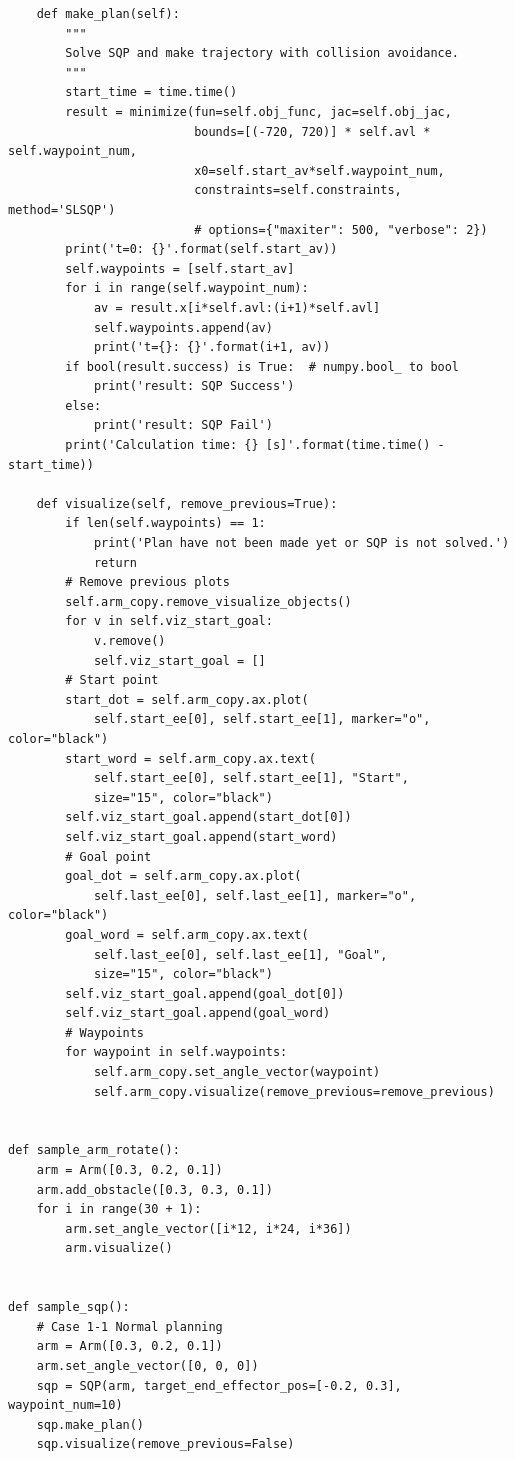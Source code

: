 \begin{verbatim}
    def make_plan(self):
        """
        Solve SQP and make trajectory with collision avoidance.
        """
        start_time = time.time()
        result = minimize(fun=self.obj_func, jac=self.obj_jac,
                          bounds=[(-720, 720)] * self.avl * self.waypoint_num,
                          x0=self.start_av*self.waypoint_num,
                          constraints=self.constraints, method='SLSQP')
                          # options={"maxiter": 500, "verbose": 2})
        print('t=0: {}'.format(self.start_av))
        self.waypoints = [self.start_av]
        for i in range(self.waypoint_num):
            av = result.x[i*self.avl:(i+1)*self.avl]
            self.waypoints.append(av)
            print('t={}: {}'.format(i+1, av))
        if bool(result.success) is True:  # numpy.bool_ to bool
            print('result: SQP Success')
        else:
            print('result: SQP Fail')
        print('Calculation time: {} [s]'.format(time.time() - start_time))

    def visualize(self, remove_previous=True):
        if len(self.waypoints) == 1:
            print('Plan have not been made yet or SQP is not solved.')
            return
        # Remove previous plots
        self.arm_copy.remove_visualize_objects()
        for v in self.viz_start_goal:
            v.remove()
            self.viz_start_goal = []
        # Start point
        start_dot = self.arm_copy.ax.plot(
            self.start_ee[0], self.start_ee[1], marker="o", color="black")
        start_word = self.arm_copy.ax.text(
            self.start_ee[0], self.start_ee[1], "Start",
            size="15", color="black")
        self.viz_start_goal.append(start_dot[0])
        self.viz_start_goal.append(start_word)
        # Goal point
        goal_dot = self.arm_copy.ax.plot(
            self.last_ee[0], self.last_ee[1], marker="o", color="black")
        goal_word = self.arm_copy.ax.text(
            self.last_ee[0], self.last_ee[1], "Goal",
            size="15", color="black")
        self.viz_start_goal.append(goal_dot[0])
        self.viz_start_goal.append(goal_word)
        # Waypoints
        for waypoint in self.waypoints:
            self.arm_copy.set_angle_vector(waypoint)
            self.arm_copy.visualize(remove_previous=remove_previous)


def sample_arm_rotate():
    arm = Arm([0.3, 0.2, 0.1])
    arm.add_obstacle([0.3, 0.3, 0.1])
    for i in range(30 + 1):
        arm.set_angle_vector([i*12, i*24, i*36])
        arm.visualize()


def sample_sqp():
    # Case 1-1 Normal planning
    arm = Arm([0.3, 0.2, 0.1])
    arm.set_angle_vector([0, 0, 0])
    sqp = SQP(arm, target_end_effector_pos=[-0.2, 0.3], waypoint_num=10)
    sqp.make_plan()
    sqp.visualize(remove_previous=False)


\end{verbatim}
